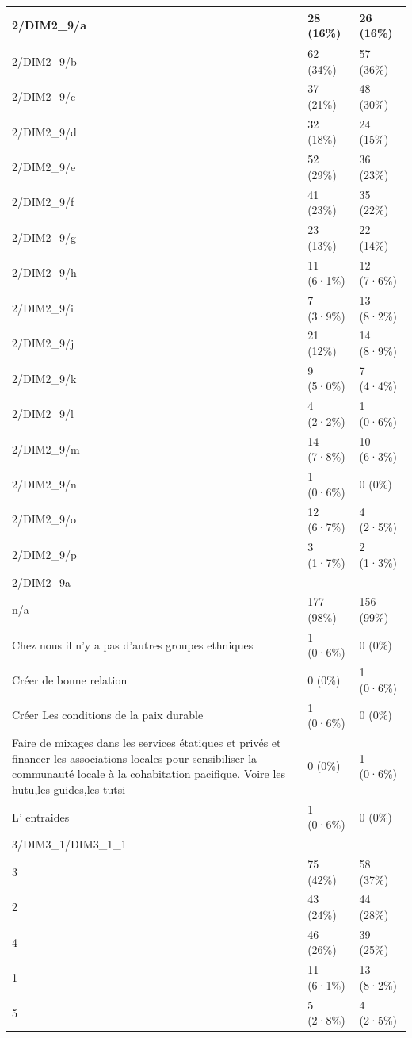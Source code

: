 \documentclass[
]{book}
\begin{document}
\begin{tabular}{l|l|l}
\hline
2/DIM2\_9/a & 28 (16\%) & 26 (16\%)\\
\hline
2/DIM2\_9/b & 62 (34\%) & 57 (36\%)\\
\hline
2/DIM2\_9/c & 37 (21\%) & 48 (30\%)\\
\hline
2/DIM2\_9/d & 32 (18\%) & 24 (15\%)\\
\hline
2/DIM2\_9/e & 52 (29\%) & 36 (23\%)\\
\hline
2/DIM2\_9/f & 41 (23\%) & 35 (22\%)\\
\hline
2/DIM2\_9/g & 23 (13\%) & 22 (14\%)\\
\hline
2/DIM2\_9/h & 11 (6·1\%) & 12 (7·6\%)\\
\hline
2/DIM2\_9/i & 7 (3·9\%) & 13 (8·2\%)\\
\hline
2/DIM2\_9/j & 21 (12\%) & 14 (8·9\%)\\
\hline
2/DIM2\_9/k & 9 (5·0\%) & 7 (4·4\%)\\
\hline
2/DIM2\_9/l & 4 (2·2\%) & 1 (0·6\%)\\
\hline
2/DIM2\_9/m & 14 (7·8\%) & 10 (6·3\%)\\
\hline
2/DIM2\_9/n & 1 (0·6\%) & 0 (0\%)\\
\hline
2/DIM2\_9/o & 12 (6·7\%) & 4 (2·5\%)\\
\hline
2/DIM2\_9/p & 3 (1·7\%) & 2 (1·3\%)\\
\hline
2/DIM2\_9a &  & \\
\hline
n/a & 177 (98\%) & 156 (99\%)\\
\hline
Chez nous il n'y a pas d'autres groupes ethniques & 1 (0·6\%) & 0 (0\%)\\
\hline
Créer de bonne relation & 0 (0\%) & 1 (0·6\%)\\
\hline
Créer Les conditions de la paix durable & 1 (0·6\%) & 0 (0\%)\\
\hline
Faire de mixages dans les services étatiques et privés et financer les associations locales pour sensibiliser la communauté locale à la cohabitation pacifique. Voire les hutu,les guides,les tutsi & 0 (0\%) & 1 (0·6\%)\\
\hline
L' entraides & 1 (0·6\%) & 0 (0\%)\\
\hline
3/DIM3\_1/DIM3\_1\_1 &  & \\
\hline
3 & 75 (42\%) & 58 (37\%)\\
\hline
2 & 43 (24\%) & 44 (28\%)\\
\hline
4 & 46 (26\%) & 39 (25\%)\\
\hline
1 & 11 (6·1\%) & 13 (8·2\%)\\
\hline
5 & 5 (2·8\%) & 4 (2·5\%)\\

\end{tabular}
\end{document}
